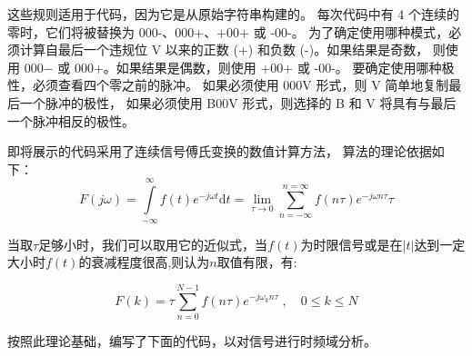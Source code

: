 \documentclass[AutoFakeBold]{LZUThesis}
\begin{document}
    这些规则适用于代码，因为它是从原始字符串构建的。
    每次代码中有 4 个连续的零时，它们将被替换为 000-、000+、+00+ 或 -00-。
    为了确定使用哪种模式，必须计算自最后一个违规位 V 以来的正数 (+) 和负数 (-)。如果结果是奇数，
    则使用 000− 或 000+。如果结果是偶数，则使用 +00+ 或 -00-。
    要确定使用哪种极性，必须查看四个零之前的脉冲。
    如果必须使用 000V 形式，则 V 简单地复制最后一个脉冲的极性，
    如果必须使用 B00V 形式，则选择的 B 和 V 将具有与最后一个脉冲相反的极性。

即将展示的代码采用了连续信号傅氏变换的数值计算方法\cite{ssmat}，
算法的理论依据如下：
\begin{equation}
    F(j\omega)  = \int\limits_{-\infty}^{\infty} f(t) e^{-j\omega t} \mathrm{d}t =
    \lim\limits_{\tau \to 0} \sum\limits_{n = -\infty}^{n = \infty} f(n\tau) e^{-j\omega n\tau} \tau
\end{equation}

当取$\tau$足够小时，我们可以取用它的近似式，当$f(t)$为时限信号或是在$|t|$达到一定
大小时$f(t)$的衰减程度很高,则认为$n$取值有限，有:

\begin{equation}
    F(k) = \tau \sum\limits_{n = 0}^{N - 1} f(n\tau) e^{-j\omega_k n\tau} \; , \quad 0 \leq k \leq N
\end{equation}

按照此理论基础，编写了下面的代码，以对信号进行时频域分析。
\end{document}
